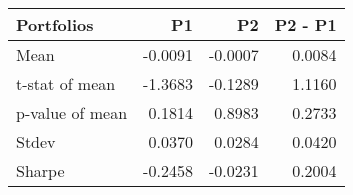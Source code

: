 \begin{tabular}{lrrr}
\toprule
Portfolios & P1 & P2 & P2 - P1 \\
\midrule
Mean & -0.0091 & -0.0007 & 0.0084 \\
t-stat of mean & -1.3683 & -0.1289 & 1.1160 \\
p-value of mean & 0.1814 & 0.8983 & 0.2733 \\
Stdev & 0.0370 & 0.0284 & 0.0420 \\
Sharpe & -0.2458 & -0.0231 & 0.2004 \\
\bottomrule
\end{tabular}

